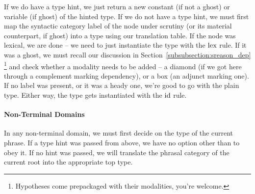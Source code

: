 If we do have a type hint, we just return a new constant (if not a ghost) or variable (if ghost) of the hinted type.
If we do not have a type hint, we must first map the syntactic category label of the node under scrutiny (or its material counterpart, if ghost) into a type using our translation table.
If the node was lexical, we are done -- we need to just instantiate the type with the $\mathrm{lex}$ rule.
If it was a ghost, we must recall our discussion in Section~\ref{subsubsection:sreason_dep}%
	\footnote{Hypotheses come prepackaged with their modalities, you're welcome.}
and check whether a modality needs to be added -- a diamond (if we got here through a complement marking dependency), or a box (an adjunct marking one).
If no label was present, or it was a heady one, we're good to go with the plain type.
Either way, the type gets instantiated with the $\mathrm{id}$ rule.

\paragraph{Non-Terminal Domains}
In any non-terminal domain, we must first decide on the type of the current phrase.
If a type hint was passed from above, we have no option other than to obey it.
If no hint was passed, we will translate the phrasal category of the current root into the appropriate top type.

